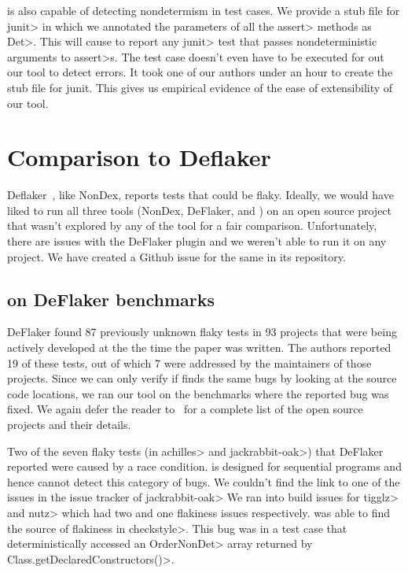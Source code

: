 \TheDeterminismChecker is also capable of detecting nondetermism in test cases. We provide a stub file
for \<junit> in which we annotated the parameters of all the \<assert> methods as \<Det>.
This will cause \TheDeterminismChecker to report any \<junit> test that passes nondeterministic arguments to 
\<assert>s. The test case doesn't even have to be executed for out our tool to detect errors.
It took one of our authors under an hour to create the stub file for junit. This gives us
empirical evidence of the ease of extensibility of our tool.


\section{Comparison to Deflaker}
Deflaker~\cite{deflaker}, like NonDex, reports tests that could be flaky. Ideally, we would have 
liked to run all three tools (NonDex, DeFlaker, and \TheDeterminismChecker) on an open source project
that wasn't explored by any of the tool for a fair comparison. Unfortunately, there are issues with the
DeFlaker plugin and we weren't able to run it on any project. We have created a Github issue for the same
in its repository.

\subsection{\TheDeterminismChecker on DeFlaker benchmarks}\label{sec:deflaker-benchmarks}
DeFlaker found 87 previously unknown flaky tests in 93 projects that were being actively developed at the the time
the paper was written. The authors reported 19 of these tests, out of which 7 were addressed by the maintainers of
those projects. Since we can only verify if \TheDeterminismChecker finds the same bugs by looking at the source code
locations, we ran our tool on the benchmarks where the reported bug was fixed. We again defer the reader to~\cite{deflaker}
for a complete list of the open source projects and their details.

Two of the seven flaky tests (in \<achilles> and \<jackrabbit-oak>) that DeFlaker reported were caused by a race condition. \TheDeterminismChecker
is designed for sequential programs and hence cannot detect this category of bugs.  
We couldn't find the link to one of the issues in the issue tracker of \<jackrabbit-oak>
We ran into build issues
for \<tigglz> and \<nutz> which had two and one flakiness issues respectively. 
\TheDeterminismChecker was able to find the source of flakiness in \<checkstyle>. This bug was in a test
case that deterministically accessed an \<OrderNonDet> array returned by \<Class.getDeclaredConstructors()>.
